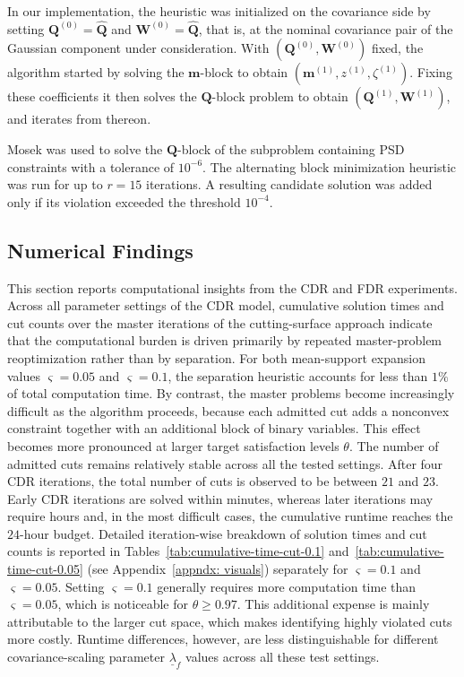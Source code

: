\documentclass[opre,sglanonrev]{informs4}
\newcommand{\bmean}{\bm{m}}
\newcommand{\bQ}{\bm Q}
\newcommand{\bW}{\bm{W}}
\begin{document}
{In our implementation, the heuristic was initialized on the covariance side by setting
\(\bQ^{(0)}=\hat{\bQ}\) and \(\bW^{(0)}=\hat{\bQ}\), that is, at the nominal
covariance pair of the Gaussian component under consideration. With
\((\bQ^{(0)},\bW^{(0)})\) fixed, the algorithm started by solving the
\(\bmean\)-block to obtain \((\bmean^{(1)}, z^{(1)}, \zeta^{(1)})\). Fixing these coefficients it then
solves the \(\bQ\)-block problem to obtain \((\bQ^{(1)},\bW^{(1)})\), and iterates from thereon.


Mosek was used to solve the $\bQ$-block of the subproblem containing PSD constraints with a tolerance of $10^{-6}$.  The alternating block minimization heuristic was run for up to $r=15$ iterations. A resulting candidate solution was added only if its violation exceeded the threshold $10^{-4}$.

\subsection{Numerical Findings}
\label{sec:numerical-results}

This section reports computational insights from the CDR and FDR experiments.
Across all parameter settings of the CDR model, cumulative solution times and
cut counts over the master iterations of the cutting-surface approach indicate
that the computational burden is driven primarily by repeated master-problem reoptimization rather than by separation. For both mean-support expansion values
\(\varsigma=0.05\) and \(\varsigma=0.1\), the separation heuristic accounts for
less than \(1\%\) of total computation time. By contrast, the master problems
become increasingly difficult as the algorithm proceeds, because each admitted
cut adds a nonconvex constraint together with an additional block of binary
variables. This effect becomes more pronounced at larger target satisfaction
levels \(\theta\).  The number of admitted cuts remains relatively stable across all the tested settings. After four CDR iterations, the total number of cuts is observed to be between \(21\) and \(23\). Early CDR
iterations are solved within minutes, whereas later iterations may require hours
and, in the most difficult cases, the cumulative runtime reaches the \(24\)-hour
budget. Detailed iteration-wise breakdown of solution times and cut counts is reported in Tables~\ref{tab:cumulative-time-cut-0.1}
and~\ref{tab:cumulative-time-cut-0.05} (see Appendix~\ref{appndx: visuals}) separately for
\(\varsigma=0.1\) and \(\varsigma=0.05\). Setting \(\varsigma=0.1\) generally requires more computation time than \(\varsigma=0.05\), which is noticeable for \(\theta\geq0.97\). This additional expense is mainly attributable to the larger cut space, which makes identifying highly violated cuts more costly. Runtime differences, however, are
less distinguishable for different covariance-scaling parameter \(\underline{\lambda}_f\) values across all these test settings.





}
\end{document}
